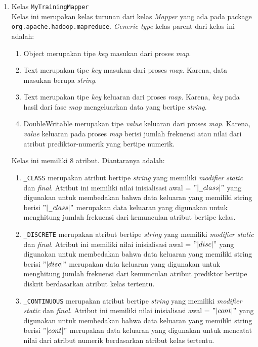 \begin{enumerate}
	\item{Kelas \texttt{MyTrainingMapper}}\\
	Kelas ini merupakan kelas turunan dari kelas \textit{Mapper} yang ada pada package \verb|org.apache.hadoop.mapreduce|. \textit{Generic type} kelas parent dari kelas ini adalah:
	\begin{enumerate}
		\item{Object} merupakan tipe \textit{key} masukan dari proses \textit{map}.
		\item{Text} merupakan tipe \textit{key} masukan dari proses \textit{map}. Karena, data masukan berupa \textit{string}.
		\item{Text} merupakan tipe \textit{key} keluaran dari proses \textit{map}. Karena, \textit{key} pada hasil dari fase \textit{map} mengeluarkan data yang bertipe \textit{string}.
		\item{DoubleWritable} merupakan tipe \textit{value} keluaran dari proses \textit{map}. Karena, \textit{value} keluaran pada proses \textit{map} berisi jumlah frekuensi atau nilai dari atribut prediktor-numerik yang bertipe numerik.
	\end{enumerate}
	Kelas ini memiliki 8 atribut. Diantaranya adalah:
	\begin{enumerate}
		\item \verb|_CLASS| merupakan atribut bertipe \textit{string} yang memiliki \textit{modifier} \textit{static} dan \textit{final}. Atribut ini memiliki nilai inisialisasi awal = $"|$\verb|_|$class|"$ yang digunakan untuk membedakan bahwa data keluaran yang memiliki string berisi $"|$\verb|_|$class|"$ merupakan data keluaran yang digunakan untuk menghitung jumlah frekuensi dari kemunculan atribut bertipe kelas.
		\item \verb|_DISCRETE| merupakan atribut bertipe \textit{string} yang memiliki \textit{modifier} \textit{static} dan \textit{final}. Atribut ini memiliki nilai inisialisasi awal = $"|disc|"$ yang digunakan untuk membedakan bahwa data keluaran yang memiliki string berisi $"|disc|"$ merupakan data keluaran yang digunakan untuk menghitung jumlah frekuensi dari kemunculan atribut prediktor bertipe diskrit berdasarkan atribut kelas tertentu.
		\item \verb|_CONTINUOUS| merupakan atribut bertipe \textit{string} yang memiliki \textit{modifier} \textit{static} dan \textit{final}. Atribut ini memiliki nilai inisialisasi awal = $"|cont|"$ yang digunakan untuk membedakan bahwa data keluaran yang memiliki string berisi $"|cont|"$ merupakan data keluaran yang digunakan untuk mencatat nilai dari atribut numerik berdasarkan atribut kelas tertentu.

\end{enumerate}
\end{enumerate}
